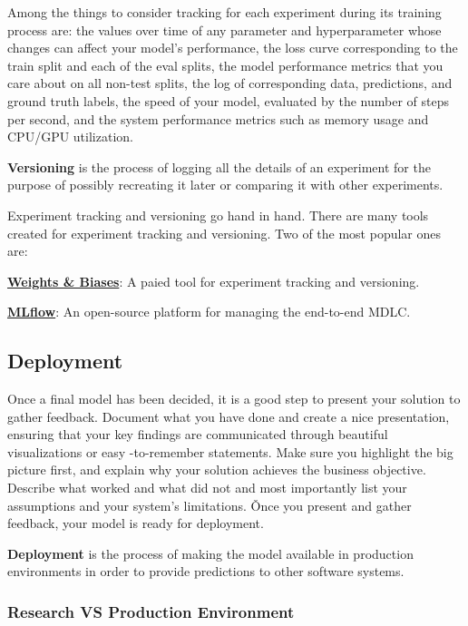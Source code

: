 Among the things to consider tracking for each experiment during its training process are: the values over time of
any parameter and hyperparameter whose changes can affect your model's performance, the loss curve corresponding to
the train split and each of the eval splits, the model performance metrics that you care about on all non-test splits,
the log of corresponding data, predictions, and ground truth labels, the speed of your model, evaluated by the
number of steps per second, and the system performance metrics such as memory usage and CPU/GPU utilization.

\bd[Versioning]
\textbf{Versioning} is the process of logging all the details of an experiment for the purpose of possibly recreating it
later or comparing it with other experiments.
\ed

Experiment tracking and versioning go hand in hand. There are many tools created for experiment tracking and
versioning. Two of the most popular ones are:
\bit
\item \href{https://www.wandb.com/}{\textbf{Weights \& Biases}}: A paied tool for experiment tracking and versioning.
\item \href{https://mlflow.org/}{\textbf{MLflow}}: An open-source platform for managing the end-to-end MDLC\@.
\eit

\subsection{Deployment}

Once a final model has been decided, it is a good step to present your solution to gather feedback. Document what you
have done and create a nice presentation, ensuring that your key findings are communicated through beautiful
visualizations or easy -to-remember statements. Make sure you highlight the big picture first, and explain why your
solution achieves the business objective. Describe what worked and what did not and most importantly list your
assumptions and your system's limitations. \v

Once you present and gather feedback, your model is ready for deployment.

\bd[Deployment]
\textbf{Deployment} is the process of making the model available in production environments in order to provide
predictions to other software systems.
\ed

\subsubsection{Research VS Production Environment}

